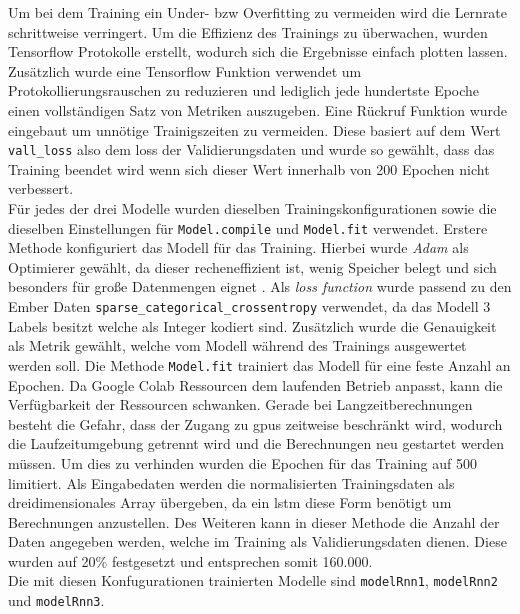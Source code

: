 \documentclass[
    12pt, %
    DIV10,
    ngerman, %
    a4paper, %
    oneside, %
    titlepage, %
    parskip=half, %
    headings=normal, %
    listof=totoc, %
    bibliography=totoc, %
    index=totoc, %
    captions=tableheading, %
    final %
]{scrreprt}
\begin{document}
Um bei dem Training ein Under- bzw Overfitting zu vermeiden wird die Lernrate schrittweise verringert. Um die Effizienz des Trainings zu überwachen, wurden Tensorflow Protokolle erstellt, wodurch sich die Ergebnisse einfach plotten lassen. Zusätzlich wurde eine Tensorflow Funktion verwendet um Protokollierungsrauschen zu reduzieren und lediglich jede hundertste Epoche einen vollständigen Satz von Metriken auszugeben. Eine Rückruf Funktion wurde eingebaut um unnötige Trainigszeiten zu vermeiden. Diese basiert auf dem Wert \texttt{vall\_loss} also dem loss der Validierungsdaten und wurde so gewählt, dass das Training beendet wird wenn sich dieser Wert innerhalb von 200 Epochen nicht verbessert.\\ Für jedes der drei Modelle wurden dieselben Trainingskonfigurationen sowie die dieselben Einstellungen für \texttt{Model.compile} und \texttt{Model.fit} verwendet.
Erstere Methode konfiguriert das Modell für das Training. Hierbei wurde \emph{Adam} als Optimierer gewählt, da dieser recheneffizient ist, wenig Speicher belegt und sich besonders für große Datenmengen eignet \parencite{Kingma2015}. Als \emph{loss function} wurde passend zu den Ember Daten \texttt{sparse\_categorical\_crossentropy} verwendet, da das Modell 3 Labels besitzt welche als Integer kodiert sind. Zusätzlich wurde die Genauigkeit als Metrik gewählt, welche vom Modell während des Trainings ausgewertet werden soll. Die Methode \texttt{Model.fit} trainiert das Modell für eine feste Anzahl an Epochen. Da Google Colab Ressourcen dem laufenden Betrieb anpasst, kann die Verfügbarkeit der Ressourcen schwanken. Gerade bei Langzeitberechnungen besteht die Gefahr, dass der Zugang zu \acs{gpus} zeitweise beschränkt wird, wodurch die Laufzeitumgebung getrennt wird und die Berechnungen neu gestartet werden müssen. Um dies zu verhinden wurden die Epochen für das Training auf 500 limitiert. Als Eingabedaten werden die normalisierten Trainingsdaten als dreidimensionales Array übergeben, da ein \ac{lstm} diese Form benötigt um Berechnungen anzustellen. Des Weiteren kann in dieser Methode die Anzahl der Daten angegeben werden, welche im Training als Validierungsdaten dienen. Diese wurden auf 20\% festgesetzt und entsprechen somit 160.000.\\
Die mit diesen Konfugurationen trainierten Modelle sind \texttt{modelRnn1}, \texttt{modelRnn2} und \texttt{modelRnn3}.\\
\end{document}
